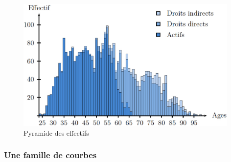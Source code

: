 \begin{figure}[H]
\begin{center}
\includegraphics[width=11cm]{images/histogra.jpg}
%
%
%
%
\end{center}
\caption{Pyramide des effectifs}
\end{figure}

%

\subsubsection{Une famille de courbes} \label{famillecourbe}

